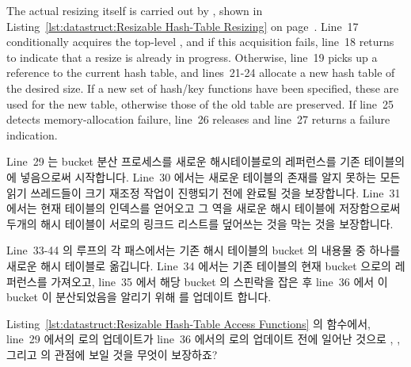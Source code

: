 The actual resizing itself is carried out by , shown in
Listing~\ref{lst:datastruct:Resizable Hash-Table Resizing} on
page~\pageref{lst:datastruct:Resizable Hash-Table Resizing}.
Line~17 conditionally acquires the top-level , and if
this acquisition fails, line~18 returns  to indicate that
a resize is already in progress.
Otherwise, line~19 picks up a reference to the current hash table,
and lines~21-24 allocate a new hash table of the desired size.
If a new set of hash/key functions have been specified, these are
used for the new table, otherwise those of the old table are preserved.
If line~25 detects memory-allocation failure, line~26 releases 
and line~27 returns a failure indication.
\fi

Line~29 는 bucket 분산 프로세스를 새로운 해시테이블로의 레퍼런스를 기존
테이블의  에 넣음으로써 시작합니다.
Line~30 에서는 새로운 테이블의 존재를 알지 못하는 모든 읽기 쓰레드들이 크기
재조정 작업이 진행되기 전에 완료될 것을 보장합니다.
Line~31 에서는 현재 테이블의 인덱스를 얻어오고 그 역을 새로운 해시 테이블에
저장함으로써 두개의 해시 테이블이 서로의 링크드 리스트를 덮어쓰는 것을 막는
것을 보장합니다.

Line~33-44 의 루프의 각 패스에서는 기존 해시 테이블의 bucket 의 내용물 중
하나를 새로운 해시 테이블로 옮깁니다.
Line~34 에서는 기존 테이블의 현재 bucket 으로의 레퍼런스를 가져오고, line~35
에서 해당 bucket 의 스핀락을 잡은 후 line~36 에서 이 bucket 이 분산되었음을
알리기 위해  를 업데이트 합니다.

\QuickQuiz{}
	Listing~\ref{lst:datastruct:Resizable Hash-Table Access Functions} 의
	 함수에서, line~29 에서의  로의
	업데이트가 line~36 에서의  로의 업데이트 전에
	일어난 것으로 , , 그리고
	 의 관점에 보일 것을 무엇이 보장하죠?
	\iffalse

